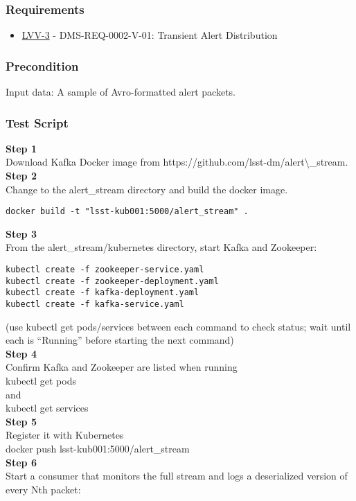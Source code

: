 \subsubsection{Requirements}\label{requirements-7}

\begin{itemize}
\tightlist
\item
  \href{https://jira.lsstcorp.org/browse/LVV-3}{LVV-3} -
  DMS-REQ-0002-V-01: Transient Alert Distribution
\end{itemize}

\subsubsection{Precondition}\label{precondition-6}

Input data: A sample of Avro-formatted alert packets.

\subsubsection{Test Script}\label{test-script-7}

\textbf{Step 1}\\
Download Kafka Docker image from
https://github.com/lsst-dm/alert\textbackslash{}\_stream.\\[2\baselineskip]\textbf{Step
2}\\
Change to the alert\_stream directory and build the docker image.\\

\begin{verbatim}
docker build -t "lsst-kub001:5000/alert_stream" .
\end{verbatim}

\textbf{Step 3}\\
From the alert\_stream/kubernetes directory, start Kafka and
Zookeeper:\\[2\baselineskip]

\begin{verbatim}
kubectl create -f zookeeper-service.yaml
kubectl create -f zookeeper-deployment.yaml
kubectl create -f kafka-deployment.yaml
kubectl create -f kafka-service.yaml
\end{verbatim}

(use kubectl get pods/services between each command to check status;
wait until each is ``Running'' before starting the next
command)\\[4\baselineskip]\textbf{Step 4}\\
Confirm Kafka and Zookeeper are listed when
running\\[2\baselineskip]kubectl get
pods\\[2\baselineskip]and\\[2\baselineskip]kubectl get
services\\[2\baselineskip]\textbf{Step 5}\\
Register it with Kubernetes\\[2\baselineskip]docker push
lsst-kub001:5000/alert\_stream\\[2\baselineskip]\textbf{Step 6}\\
Start a consumer that monitors the full stream and logs a deserialized
version of every Nth packet:\\

